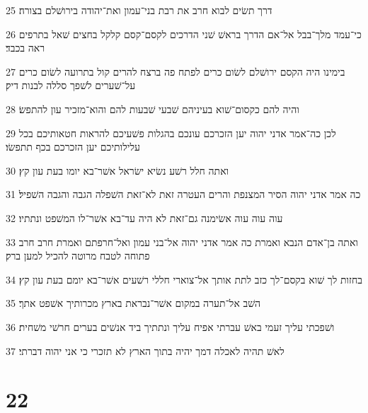 \par 25 דרך תשׂים לבוא חרב את רבת בני־עמון ואת־יהודה בירושׁלם בצורה׃
\par 26 כי־עמד מלך־בבל אל־אם הדרך בראשׁ שׁני הדרכים לקסם־קסם קלקל בחצים שׁאל בתרפים ראה בכבד׃
\par 27 בימינו היה הקסם ירושׁלם לשׂום כרים לפתח פה ברצח להרים קול בתרועה לשׂום כרים על־שׁערים לשׁפך סללה לבנות דיק׃
\par 28 והיה להם כקסום־שׁוא בעיניהם שׁבעי שׁבעות להם והוא־מזכיר עון להתפשׂ׃
\par 29 לכן כה־אמר אדני יהוה יען הזכרכם עונכם בהגלות פשׁעיכם להראות חטאותיכם בכל עלילותיכם יען הזכרכם בכף תתפשׂו׃
\par 30 ואתה חלל רשׁע נשׂיא ישׂראל אשׁר־בא יומו בעת עון קץ׃
\par 31 כה אמר אדני יהוה הסיר המצנפת והרים העטרה זאת לא־זאת השׁפלה הגבה והגבה השׁפיל׃
\par 32 עוה עוה עוה אשׂימנה גם־זאת לא היה עד־בא אשׁר־לו המשׁפט ונתתיו׃
\par 33 ואתה בן־אדם הנבא ואמרת כה אמר אדני יהוה אל־בני עמון ואל־חרפתם ואמרת חרב חרב פתוחה לטבח מרוטה להכיל למען ברק׃
\par 34 בחזות לך שׁוא בקסם־לך כזב לתת אותך אל־צוארי חללי רשׁעים אשׁר־בא יומם בעת עון קץ׃
\par 35 השׁב אל־תערה במקום אשׁר־נבראת בארץ מכרותיך אשׁפט אתך׃
\par 36 ושׁפכתי עליך זעמי באשׁ עברתי אפיח עליך ונתתיך ביד אנשׁים בערים חרשׁי משׁחית׃
\par 37 לאשׁ תהיה לאכלה דמך יהיה בתוך הארץ לא תזכרי כי אני יהוה דברתי׃

\chapter{22}

